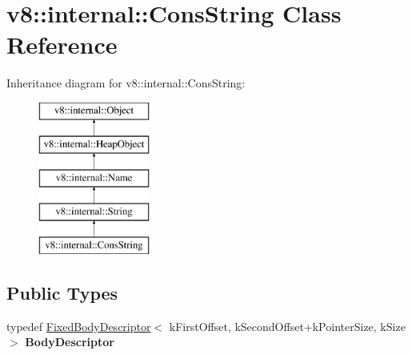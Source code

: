 \hypertarget{classv8_1_1internal_1_1_cons_string}{}\section{v8\+:\+:internal\+:\+:Cons\+String Class Reference}
\label{classv8_1_1internal_1_1_cons_string}
Inheritance diagram for v8\+:\+:internal\+:\+:Cons\+String\+:\begin{figure}[H]
\begin{center}
\leavevmode
\includegraphics[height=5.000000cm]{classv8_1_1internal_1_1_cons_string}
\end{center}
\end{figure}
\subsection*{Public Types}
\begin{DoxyCompactItemize}
\item 
typedef \hyperlink{classv8_1_1internal_1_1_fixed_body_descriptor}{Fixed\+Body\+Descriptor}$<$ k\+First\+Offset, k\+Second\+Offset+k\+Pointer\+Size, k\+Size $>$ {\bfseries Body\+Descriptor}\hypertarget{classv8_1_1internal_1_1_cons_string_a9605778fa02003dffc396b8a7842d380}{}\label{classv8_1_1internal_1_1_cons_string_a9605778fa02003dffc396b8a7842d380}

\end{DoxyCompactItemize}
